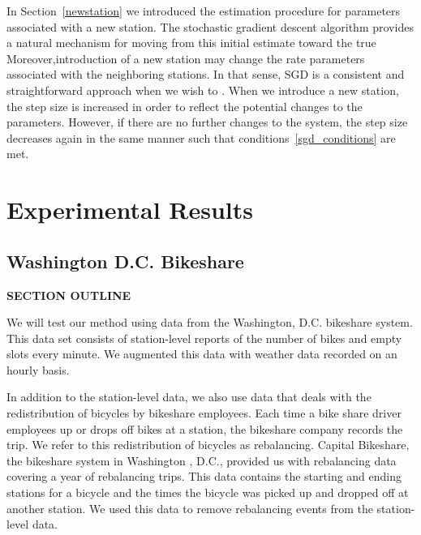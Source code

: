 \documentclass{acm_proc_article-sp}
\begin{document}
In Section~\ref{newstation} we introduced the estimation procedure for parameters associated with a new station.  The stochastic gradient descent algorithm provides a natural mechanism for moving from this initial estimate toward the true Moreover,introduction of a new station may change the rate parameters associated with the neighboring stations.  In that sense, SGD is a consistent and straightforward approach when we wish to .  When we introduce a new station, the step size is increased in order to reflect the potential changes to the parameters.  However, if there are no further changes to the system, the step size decreases again in the same manner such that conditions~\eqref{sgd_conditions} are met.



\section{Experimental Results}

\vspace{0.25cm}

\subsection{Washington D.C. Bikeshare}
\vspace{0.25cm}
{\bf SECTION OUTLINE}

We will test our method using data from the Washington, D.C. bikeshare system. This data set consists of station-level reports of the number of bikes and empty slots every minute. We augmented this data with weather data recorded on an hourly basis.

In addition to the station-level data, we also use data that deals with the redistribution of bicycles by bikeshare employees. Each time a bike share driver employees up or drops off bikes at a station, the bikeshare company records the trip. We refer to this redistribution of bicycles as rebalancing. Capital Bikeshare, the bikeshare system in Washington , D.C.,  provided us with rebalancing data covering a year of rebalancing trips. This data contains the starting and ending stations for a bicycle and the times the bicycle was picked up and dropped off at another station. We used this data to remove rebalancing events from the station-level data. 
\end{document}
